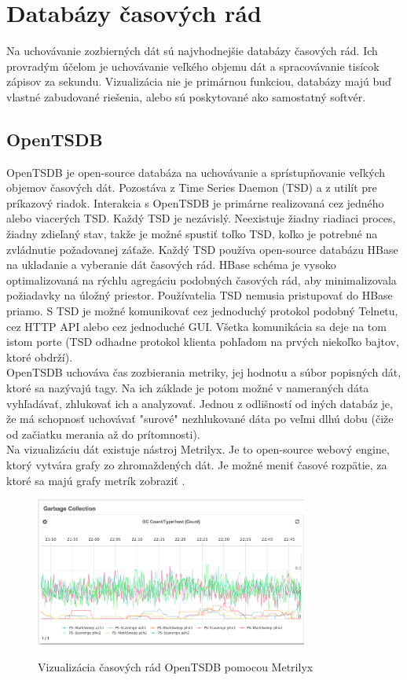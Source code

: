 \documentclass[11pt,final,oneside]{fithesis}
\begin{document}
\section{Databázy časových rád}
Na uchovávanie zozbierných dát sú najvhodnejšie databázy časových rád. Ich provradým účelom je uchovávanie veľkého objemu dát a spracovávanie tisícok zápisov za sekundu. Vizualizácia nie je primárnou funkciou,
databázy majú buď vlastné zabudované riešenia, alebo sú poskytované ako samostatný softvér.

\subsection{OpenTSDB}
OpenTSDB je open-source databáza na uchovávanie a sprístupňovanie veľkých objemov časových dát. Pozostáva z Time Series Daemon (TSD) a z utilít pre príkazový riadok. Interakcia s OpenTSDB je primárne realizovaná cez jedného alebo viacerých TSD. Každý TSD je nezávislý.
Neexistuje žiadny riadiaci proces, žiadny zdieľaný stav, takže je možné spustiť toľko TSD, koľko je potrebné na zvládnutie požadovanej záťaže. Každý TSD používa open-source databázu HBase
na ukladanie a vyberanie dát časových rád. HBase schéma je vysoko optimalizovaná na rýchlu agregáciu podobných časových rád, aby minimalizovala požiadavky na úložný priestor. 
Používatelia TSD nemusia pristupovať do HBase priamo. S TSD je možné komunikovať cez jednoduchý protokol podobný Telnetu, cez HTTP API alebo cez jednoduché GUI. Všetka komunikácia
sa deje na tom istom porte (TSD odhadne protokol klienta pohľadom na prvých niekoľko bajtov, ktoré obdrží).\cite{openTSDB}
\\OpenTSDB uchováva čas zozbierania metriky, jej hodnotu a súbor popisných dát, ktoré sa nazývajú tagy. Na ich základe je potom možné
v nameraných dáta vyhľadávať, zhlukovať ich a analyzovať. Jednou z odlišností od iných databáz je, že má schopnosť uchovávať "surové" nezhlukované dáta po veľmi dlhú dobu (čiže od začiatku merania až do prítomnosti).
\\Na vizualizáciu dát existuje nástroj Metrilyx. Je to open-source webový engine, ktorý vytvára grafy zo zhromaždených dát. Je možné meniť časové rozpätie, za ktoré sa majú grafy metrík zobraziť .
\begin{figure}[h]
\begin{center}
       \includegraphics[width=0.8\textwidth]{images/metrilyx.png}
       \caption{Vizualizácia časových rád OpenTSDB pomocou Metrilyx}\cite{Metrilyx}
\end{center}
\end{figure}
\end{document}
